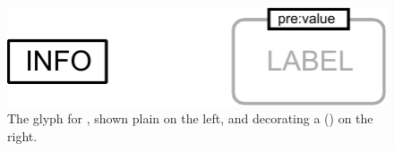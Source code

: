 \begin{figure}[H]
  \centering
  \includegraphics{images/unitInformation}
  \caption{The \PD glyph for , shown plain on the left, and decorating a  () on the right.}
  \label{fig:unitInfo}
\end{figure}


